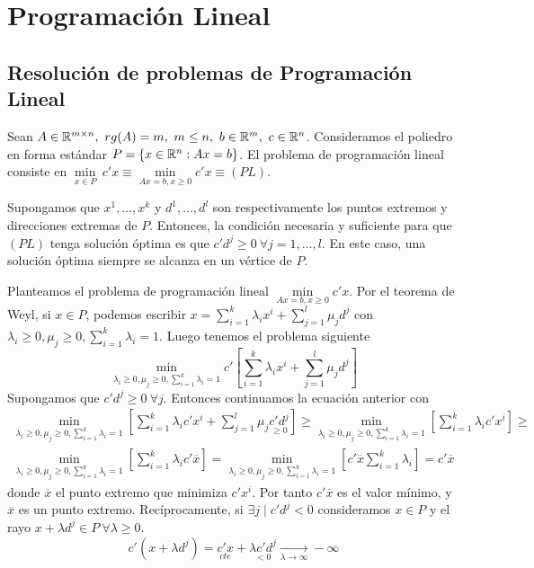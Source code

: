 \documentclass[PM.tex]{subfiles}
\begin{document}
\chapter{Programación Lineal}

\section{Resolución de problemas de Programación Lineal}

Sean $A\in\mathbb{R}^{m\times n},\ rg(A)=m,\ m\leq n,\ b\in\mathbb{R}^m,\ c\in\mathbb{R}^n$. Consideramos el poliedro en forma estándar $P=\{x\in\mathbb{R}^n: Ax=b\}$. El problema de programación lineal consiste en $\underset{x\in P}{\min}\ c'x \equiv \underset{Ax=b,x\geq 0}{\min} c'x\equiv (PL)$. 

\begin{theorem} Supongamos que $x^1,\dots ,x^k$ y $d^1,\dots ,d^l$ son respectivamente los puntos extremos y direcciones extremas de $P$. Entonces, la condición necesaria y suficiente para que $(PL)$ tenga solución óptima es que $c'd^j\geq 0\ \forall j=1,\dots, l$. En este caso, una solución óptima siempre se alcanza en un vértice de $P$.
\end{theorem}
\begin{dem}
Planteamos el problema de programación lineal $\underset{Ax=b,x\geq 0}{\min} c'x$. Por el teorema de Weyl, si $x\in P$, podemos escribir $x=\sum_{i=1}^k\lambda_ix^i +\sum_{j=1}^l\mu_j d^j$ con $\lambda_i\geq 0, \mu_j\geq 0, \sum_{i=1}^k\lambda_i=1$. Luego tenemos el problema siguiente
\[\underset{\lambda_i\geq 0, \mu_j\geq 0, \sum_{i=1}^k\lambda_i=1}{\min} c'\left[\sum_{i=1}^k\lambda_ix^i +\sum_{j=1}^l\mu_j d^j\right] \]
Supongamos que $c'd^j\geq 0\ \forall j$. Entonces continuamos la ecuación anterior con 
\begin{gather*}
 \underset{\lambda_i\geq 0, \mu_j\geq 0, \sum_{i=1}^k\lambda_i=1}{\min} \left[\sum_{i=1}^k\lambda_ic'x^i +\sum_{j=1}^l\mu_j \underset{\geq 0}{c'd^j}\right]\geq \underset{\lambda_i\geq 0, \mu_j\geq 0, \sum_{i=1}^k\lambda_i=1}{\min} \left[\sum_{i=1}^k\lambda_ic'x^i\right]\geq \\
\underset{\lambda_i\geq 0, \mu_j\geq 0, \sum_{i=1}^k\lambda_i=1}{\min} \left[\sum_{i=1}^k\lambda_ic'\overline{x}\right]= \underset{\lambda_i\geq 0, \mu_j\geq 0, \sum_{i=1}^k\lambda_i=1}{\min} \left[c'\overline{x}\sum_{i=1}^k\lambda_i\right]=c'\overline{x}
\end{gather*}
donde $\overline{x}$ el punto extremo que minimiza $c'x^i$. Por tanto $c'\overline{x}$ es el valor mínimo, y $\overline{x}$ es un punto extremo. Recíprocamente, si $\exists j\mid c'd^j<0$ consideramos $x\in P$ y el rayo $x+\lambda d^j\in P\ \forall\lambda\geq 0$. 
\[ c'(x+\lambda d^j)=\underset{cte}{c'x} + \underset{<0}{\lambda c' d^j}\underset{\lambda\to\infty}{\longrightarrow} -\infty\]
\end{dem}
\end{document}
